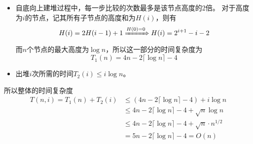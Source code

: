 \begin{questions}
\begin{solution}
        \begin{itemize}
            \item 自底向上建堆过程中，每一步比较的次数最多是该节点高度的2倍。
                  对于高度为$i$的节点，记其所有子节点的高度和为$H(i)$，则有
                  \begin{align*}
                      H(i) = 2H(i-1) + 1 \xRightarrow{H(0) = 0} H(i) = 2^{i+1} - i - 2
                  \end{align*}
                  而$n$个节点的最大高度为$\log n$，所以这一部分的时间复杂度为\[
                      T_1(n) = 4n - 2 \lceil \log n \rceil - 4
                  \]
            \item 出堆$i$次所需的时间$ T_2(i) \le i \log n $。
        \end{itemize}
        所以整体的时间复杂度\begin{align*}
            T(n, i) = T_1(n) + T_2(i) & \le (4n - 2\lceil \log n \rceil - 4) + i \log n             \\
                                      & \le 4n - 2\lceil \log n \rceil - 4 + \sqrt{n} \log n        \\
                                      & \le 4n - 2\lceil \log n \rceil - 4 + \sqrt{n} \cdot n^{1/2} \\
                                      & = 5n - 2\lceil \log n \rceil - 4 = O(n)
        \end{align*}

    \end{solution}

\end{questions}
